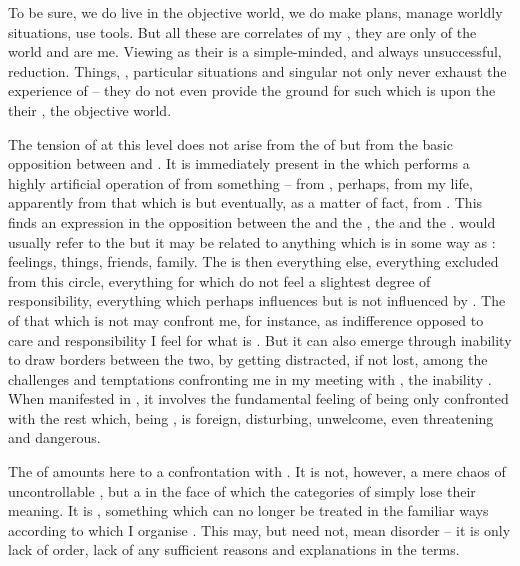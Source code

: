 To be sure, we do live in the {objective world}, we do make plans, manage
worldly situations, use tools.  But all these  are correlates of
my , they are only  of the world and are  me.
Viewing  as their  is a simple-minded, and always
unsuccessful, reduction.  Things, , particular situations and
singular  not only never exhaust the experience of  -- they do not even provide the ground for such  which is
 upon the  their ,
 the {objective world}.

\pa The tension of  at this level does not arise
from the  of  but from the basic opposition between
 and .  It is immediately present in the  which performs a highly artificial operation of  from something -- from , perhaps, from {my life},
apparently from that which is  but
eventually, as a matter of fact, from .  This  finds
an expression in the 
opposition between the  and the , the  and the
.   would usually refer to the  but it
may be related to anything which is in some way  as :
 feelings,  things,  friends,  family.  The
 is then everything else, everything excluded from this 
circle, everything for which  do not feel a slightest degree of
responsibility, everything which perhaps influences  but is not influenced by
.  The  of that which is not  may {confront me},
for instance, as  indifference opposed to care and responsibility I feel
for what is . But it can also emerge through  inability to
draw borders between the two, by  getting distracted, if not lost, among
the challenges and temptations confronting me in my meeting with ,
the inability .  When manifested in , it
involves the fundamental feeling of being only  confronted with the
rest which, being , is foreign, disturbing, unwelcome, even
threatening and dangerous.

\pa The  of  amounts here to a
confrontation with . It is not, however, a mere chaos of
uncontrollable , but a  in the face of which the categories
of  simply lose their meaning. It is , something which can no longer be treated in the familiar ways
according to which I organise .  This  may, but need
not, mean disorder -- it is only lack of  order, lack of any
sufficient reasons and explanations in the  terms.

